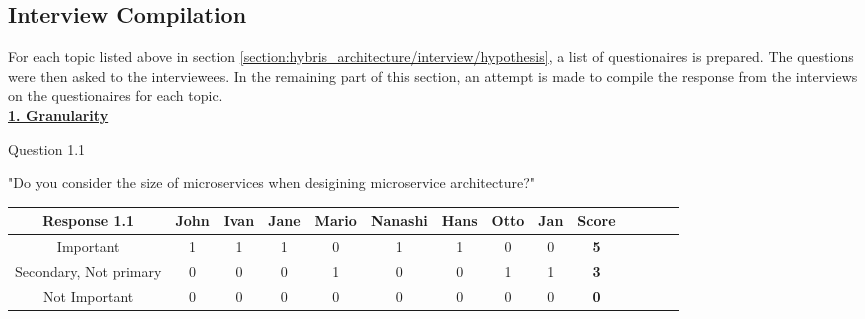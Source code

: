 \subsection{Interview Compilation}\label{section:hybris_architecture/interview/interview_compilation}
For each topic listed above in section \ref{section:hybris_architecture/interview/hypothesis}, a list of questionaires is prepared. The questions were then asked to the interviewees. In the remaining part of this section, an attempt is made to compile the response from the interviews on the questionaires for each topic.
\\
\textbf{\underline{1. Granularity}}\\  
\begin{shaded} Question 1.1 \end{shaded} \label{question:hybris_architecture/interview/question_1.1}
"Do you consider the size of microservices when desigining microservice architecture?"\\
\begin{table}[H]
\centering
\begin{adjustbox}{max width=\textwidth}
\begin{tabular}{*{14}{|c}|}%
\hline
\textbf{Response 1.1} & John & Ivan & Jane & Mario & Nanashi & Hans & Otto & Jan & \textbf{Score}\\
 \hline
Important               & 1 & 1 & 1 & 0 & 1 & 1 & 0 & 0 & \textbf{5}    \\ 
 \hline
Secondary, Not primary  & 0 & 0 & 0 & 1 & 0 & 0 & 1 & 1 & \textbf{3} \\ 
 \hline
Not Important           & 0 & 0 & 0 & 0 & 0 & 0 & 0 & 0 & \textbf{0} \\ 
 \hline
 \hline
\end{tabular}
\end{adjustbox}
\label{tab:hybris_architecture/interview/question_1.1}
\end{table}
\\
\\

